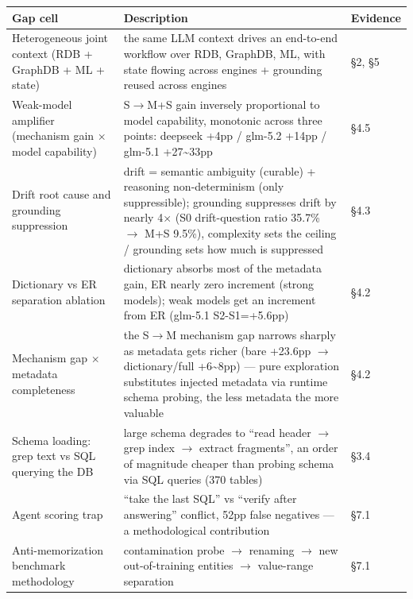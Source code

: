 \documentclass[11pt]{article}
\begin{document}
{\small
\begin{tabular}{@{}
  >{\raggedright\arraybackslash}p{}
  >{\raggedright\arraybackslash}p{}
  >{\raggedright\arraybackslash}p{}@{}}
\toprule
Gap cell & Description & Evidence \\
\midrule
Heterogeneous joint context (RDB + GraphDB + ML + state) & the same LLM context drives an end-to-end workflow over RDB, GraphDB, ML, with state flowing across engines + grounding reused across engines & \S{}2, \S{}5 \\
Weak-model amplifier (mechanism gain $\times$ model capability) & S$\rightarrow$M+S gain inversely proportional to model capability, monotonic across three points: deepseek +4pp / glm-5.2 +14pp / glm-5.1 +27\textasciitilde33pp & \S{}4.5 \\
Drift root cause and grounding suppression & drift = semantic ambiguity (curable) + reasoning non-determinism (only suppressible); grounding suppresses drift by nearly 4$\times$ (S0 drift-question ratio 35.7\% $\rightarrow$ M+S 9.5\%), complexity sets the ceiling / grounding sets how much is suppressed & \S{}4.3 \\
Dictionary vs ER separation ablation & dictionary absorbs most of the metadata gain, ER nearly zero increment (strong models); weak models get an increment from ER (glm-5.1 S2-S1=+5.6pp) & \S{}4.2 \\
Mechanism gap $\times$ metadata completeness & the S$\rightarrow$M mechanism gap narrows sharply as metadata gets richer (bare +23.6pp $\rightarrow$ dictionary/full +6\textasciitilde8pp) --- pure exploration substitutes injected metadata via runtime schema probing, the less metadata the more valuable & \S{}4.2 \\
Schema loading: grep text vs SQL querying the DB & large schema degrades to ``read header $\rightarrow$ grep index $\rightarrow$ extract fragments'', an order of magnitude cheaper than probing schema via SQL queries (370 tables) & \S{}3.4 \\
Agent scoring trap & ``take the last SQL'' vs ``verify after answering'' conflict, 52pp false negatives --- a methodological contribution & \S{}7.1 \\
Anti-memorization benchmark methodology & contamination probe $\rightarrow$ renaming $\rightarrow$ new out-of-training entities $\rightarrow$ value-range separation & \S{}7.1 \\
\bottomrule
\end{tabular}}
\end{document}
